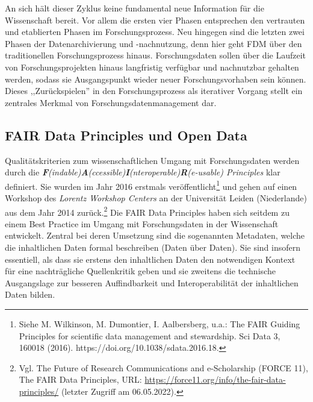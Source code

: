 An sich hält dieser Zyklus keine fundamental neue Information für die Wissenschaft bereit. Vor allem die ersten vier Phasen entsprechen den vertrauten und etablierten Phasen im Forschungsprozess. Neu hingegen sind die letzten zwei Phasen der Datenarchivierung und -nachnutzung, denn hier geht FDM über den traditionellen Forschungsprozess hinaus. Forschungsdaten sollen über die Laufzeit von Forschungsprojekten hinaus langfristig verfügbar und nachnutzbar gehalten werden, sodass sie Ausgangspunkt wieder neuer Forschungsvorhaben sein können. Dieses ,,Zurückspielen'' in den Forschungsprozess als iterativer Vorgang stellt ein zentrales Merkmal von Forschungsdatenmanagement dar.

\subsection{FAIR Data Principles und Open Data}

Qualitätskriterien zum wissenschaftlichen Umgang mit Forschungsdaten werden durch die \textit{\textbf{F}(indable)\textbf{A}(ccessible)\textbf{I}(nteroperable)\textbf{R}(e-usable) Principles} klar definiert. Sie wurden im Jahr 2016 erstmals veröffentlicht\footnote{Siehe M. Wilkinson, M. Dumontier, I. Aalbersberg, u.a.: The FAIR Guiding Principles for scientific data management and stewardship. Sci Data 3, 160018 (2016). https://doi.org/10.1038/sdata.2016.18.} und gehen auf einen Workshop des \textit{Lorentz Workshop Centers} an der Universität Leiden (Niederlande) aus dem Jahr 2014 zurück.\footnote{Vgl. The Future of Research Communications and e-Scholarship (FORCE 11), The FAIR Data Principles, URL: \url{https://force11.org/info/the-fair-data-principles/} (letzter Zugriff am 06.05.2022).} Die FAIR Data Principles haben sich seitdem zu einem Best Practice im Umgang mit Forschungsdaten in der Wissenschaft entwickelt. Zentral bei deren Umsetzung sind die sogenannten Metadaten, welche die inhaltlichen Daten formal beschreiben (Daten über Daten). Sie sind insofern essentiell, als dass sie erstens den inhaltlichen Daten den notwendigen Kontext für eine nachträgliche Quellenkritik geben und sie zweitens die technische Ausgangslage zur besseren Auffindbarkeit und Interoperabilität der inhaltlichen Daten bilden. 

